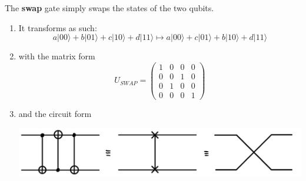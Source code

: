 \documentclass{article}
\begin{document}
    \begin{definition}[Swap]
      The \textbf{swap} gate simply swaps the states of the two qubits.
      \begin{enumerate} 
        \item It transforms as such: 
          \begin{equation} 
            a |00\rangle + b |01\rangle + c|10\rangle + d|11\rangle \mapsto a |00\rangle + c |01\rangle + b|10\rangle + d|11\rangle
          \end{equation}
        \item with the matrix form 
          \begin{equation} 
            U_{SWAP} = \begin{pmatrix} 1&0&0&0\\0&0&1&0\\0&1&0&0\\0&0&0&1 \end{pmatrix}
          \end{equation}
        \item and the circuit form 
          \begin{center}
            \includegraphics[scale=0.3]{img/Swap_Gate.jpg}
          \end{center}
      \end{enumerate}
    \end{definition}
\end{document}
